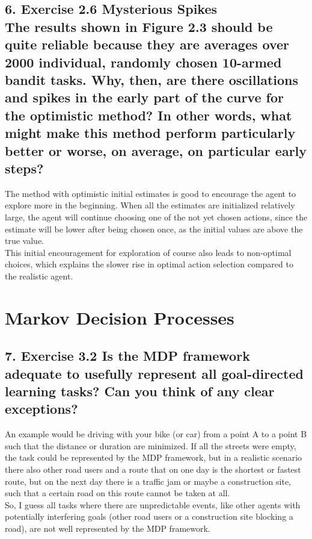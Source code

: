 \subsection*{6. Exercise 2.6 Mysterious Spikes\\The results shown in Figure 2.3 should be quite reliable because they are averages over 2000 individual, randomly chosen 10-armed bandit tasks. Why, then, are there oscillations and spikes in the early part of the curve for the optimistic method? In other words, what might make this method perform particularly better or worse, on average, on particular early steps?}
The method with optimistic initial estimates is good to encourage the agent to explore more in the beginning. When all the estimates are initialized relatively large, the agent will continue choosing one of the not yet chosen actions, since the estimate will be lower after being chosen once, as the initial values are above the true value.\\
This initial encouragement for exploration of course also leads to non-optimal choices, which explains the slower rise in optimal action selection compared to the realistic agent.

\newpage
\section{Markov Decision Processes}
\subsection*{7. Exercise 3.2 Is the MDP framework adequate to usefully represent all goal-directed learning tasks? Can you think of any clear exceptions?}
An example would be driving with your bike (or car) from a point A to a point B such that the distance or duration are minimized.
If all the streets were empty, the task could be represented by the MDP framework, but in a realistic scenario there also other road users and a route that on one day is the shortest or fastest route, but on the next day there is a traffic jam or maybe a construction site, such that a certain road on this route cannot be taken at all. \\
So, I guess all tasks where there are unpredictable events, like other agents with potentially interfering goals (other road users or a construction site blocking a road), are not well represented by the MDP framework.

